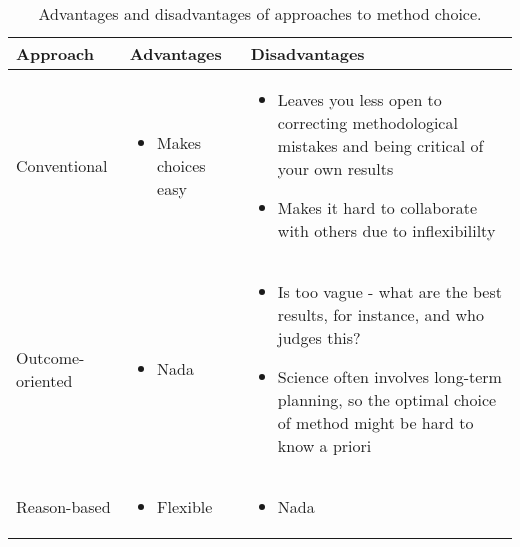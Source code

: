 \begin{table}[!ht]
	\centering
	\begin{tabular}{| l | p{2in} | p{2in} |}
		\hline
		\textbf{Approach} & \textbf{Advantages} & \textbf{Disadvantages} \\
		\hline
		Conventional      & \begin{itemize}
			\item Makes choices easy
		\end{itemize} & \begin{itemize}
			\item Leaves you less open to correcting methodological mistakes and being critical of your own results
			\item Makes it hard to collaborate with others due to inflexibililty
	    \end{itemize} \\
    	\hline
    	Outcome-oriented & \begin{itemize}
    		\item Nada
    	\end{itemize} & \begin{itemize}
    		\item Is too vague - what are the best results, for instance, and who judges this?
    		\item Science often involves long-term planning, so the optimal choice of method might be hard to know a priori
	    \end{itemize} \\
    	\hline
    	Reason-based & \begin{itemize}
    		\item Flexible
    	\end{itemize} & \begin{itemize}
    		\item Nada
    	\end{itemize} \\
    	\hline
	\end{tabular}
	\caption{Advantages and disadvantages of approaches to method choice.}
\end{table}